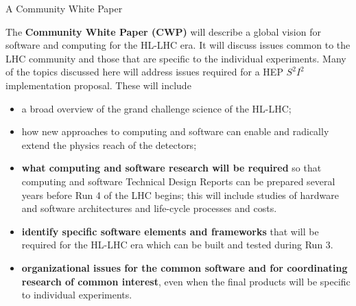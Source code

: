 \documentclass[compress,10]{beamer}
\begin{document}
\begin{frame}[fragile]{A Community White Paper }{}
{\footnotesize
The {\bf Community White Paper (CWP)} will describe a global
vision for software and computing for the HL-LHC era.
It will discuss issues  common to
the LHC community  and  those that  are specific
to the individual experiments.
Many of the topics discussed here will address issues
required for a HEP $ S^2 I^2 $ implementation
proposal.
These will include
\begin{itemize}
  \item
    a broad overview of the grand challenge science of the HL-LHC;
  \item
    how new approaches to computing and software can enable and
    radically extend the physics reach of the detectors;
  \item
    \textcolor{brickred}{\bf
    what computing and software research will be required} so that
    computing and software Technical Design Reports
    can be prepared several years before Run 4 of the LHC begins;
    this will include studies of hardware and software architectures
    and life-cycle processes and costs.
   \item
    \textcolor{brickred}{\bf
    identify specific software elements and frameworks} that will
    be required for the HL-LHC era which can be built and tested
    during Run 3.
   \item
     \textcolor{brickred}{\bf
     organizational issues for the common software and for
     coordinating research of common interest}, even when the
     final products will be specific to individual experiments.
\end{itemize}
}  %

\end{frame}
\end{document}
